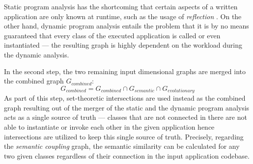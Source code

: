 \documentclass[12pt,a4paper]{report}
\begin{document}
Static program analysis has the shortcoming that certain aspects of a written
application are only known at runtime, such as the usage of \textit{reflection}
\cite{landman2017reflection}. On the other hand, dynamic program analysis
entails the problem that it is by no means guaranteed that every class of the
executed application is called or even instantiated --- the resulting graph is
highly dependent on the workload during the dynamic analysis.

In the second step, the two remaining input dimensional graphs are merged into
the combined graph \(G_{combined}\):
\[
  G_{combined} = G_{combined} \cap G_{semantic} \cap G_{evolutionary}
\]
As part of this step, set-theoretic
intersections are used instead as the combined graph resulting out of the
merger of the static and the dynamic program analysis acts as a single source
of truth --- classes that are not connected in there are not able to
instantiate or invoke each other in the given application hence intersections
are utilized to keep this single source of truth. Precisely, regarding the
\textit{semantic coupling} graph, the semantic similarity can be calculated for
any two given classes regardless of their connection in the input application
codebase.
\end{document}
